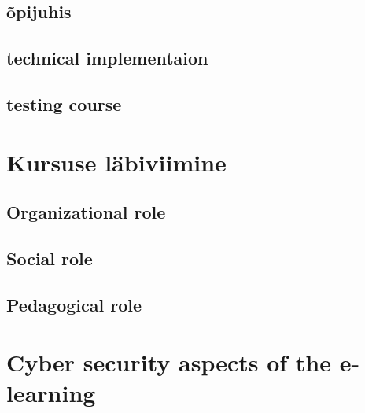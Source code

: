 \subsection{õpijuhis }
\subsection{technical implementaion}
\subsection{testing course}
\section{Kursuse läbiviimine}
\subsection{Organizational role}
\subsection{Social role}
\subsection{Pedagogical role}

\section{Cyber security aspects of the e-learning}
